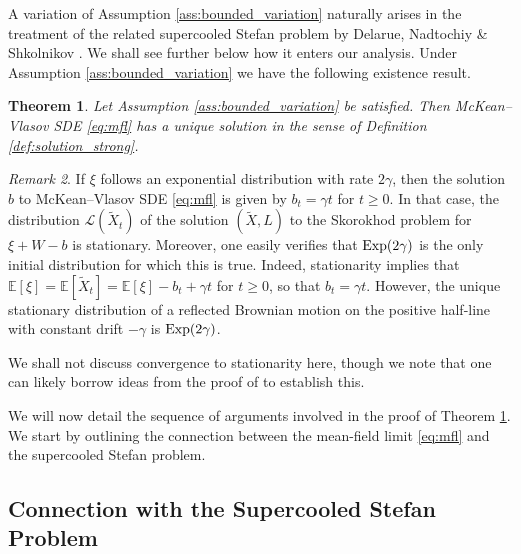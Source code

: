 \documentclass[11pt, a4paper]{article}
\theoremstyle{plain}
\newtheorem{theorem}{Theorem}[section]
\theoremstyle{definition}
\theoremstyle{remark}
\newtheorem{remark}[theorem]{Remark}
\numberwithin{equation}{section}
\newcommand{\ev}{\mathbb{E}}
\renewcommand{\L}{\mathcal{L}}
\begin{document}
A variation of Assumption \ref{ass:bounded_variation} naturally arises in the treatment of the related supercooled Stefan problem by Delarue, Nadtochiy \& Shkolnikov \cite{delarue_stefan_2022}. We shall see further below how it enters our analysis. Under Assumption \ref{ass:bounded_variation} we have the following existence result.

\begin{theorem} \label{thm:mfl_exist}
Let Assumption \ref{ass:bounded_variation} be satisfied. Then McKean--Vlasov SDE \eqref{eq:mfl} has a unique solution in the sense of Definition \ref{def:solution_strong}.
\end{theorem}

\begin{remark}
If $\xi$ follows an exponential distribution with rate $2\gamma$, then the solution $b$ to McKean--Vlasov SDE \eqref{eq:mfl} is given by $b_t = \gamma t$ for $t \geq 0$. In that case, the distribution $\L(\tilde{X}_t)$ of the solution $(\tilde{X}, L)$ to the Skorokhod problem for $\xi + W - b$ is stationary. Moreover, one easily verifies that $\textup{Exp}(2\gamma)$ is the only initial distribution for which this is true. Indeed, stationarity implies that $\ev[\xi] = \ev[\tilde{X}_t] = \ev[\xi] - b_t + \gamma t$ for $t \geq 0$, so that $b_t = \gamma t$. However, the unique stationary distribution of a reflected Brownian motion on the positive half-line with constant drift $-\gamma$ is $\textup{Exp}(2\gamma)$. 

We shall not discuss convergence to stationarity here, though we note that one can likely borrow ideas from the proof of \cite[Theorem 1.16]{baker_loc_times_2025} to establish this.
\end{remark}

We will now detail the sequence of arguments involved in the proof of Theorem \ref{thm:mfl_exist}. We start by outlining the connection between the mean-field limit \eqref{eq:mfl} and the supercooled Stefan problem.


\subsection{Connection with the Supercooled Stefan Problem}
\end{document}
